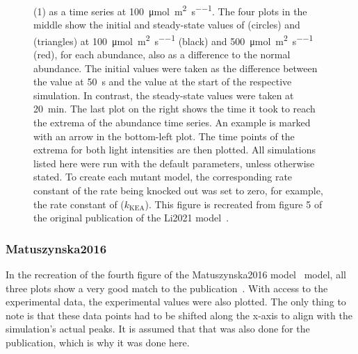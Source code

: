 \begin{figure}
{(1) as a time series at \qty{100}{\micro\mol\per\square\meter\per\second}. The four plots in the middle show the initial and steady-state values of  (circles) and  (triangles) at \qty{100}{\micro\mol\per\square\meter\per\second} (black) and \qty{500}{\micro\mol\per\square\meter\per\second} (red), for each abundance, also as a difference to the normal abundance. The initial values were taken as the difference between the value at \qty{50}{\second} and the value at the start of the respective simulation. In contrast, the steady-state values were taken at \qty{20}{\minute}. The last plot on the right shows the time it took to reach the extrema of the  abundance time series. An example is marked with an arrow in the bottom-left plot. The time points of the extrema for both light intensities are then plotted. All simulations listed here were run with the default parameters, unless otherwise stated. To create each mutant model, the corresponding rate constant of the rate being knocked out was set to zero, for example, the rate constant of  ($k_\mathrm{KEA}$). This figure is recreated from figure 5 of the original publication of the Li2021 model~\cite{liImpactIonFluxes2021}.
    }
    \label{fig:li2021-fig5}
\end{figure}

\subsubsection{Matuszynska2016}

In the recreation of the fourth figure of the Matuszynska2016 model~\cite{matuszynskaMathematicalModelNonphotochemical2016} model, all three plots show a very good match to the publication~. With access to the experimental data, the experimental values were also plotted. The only thing to note is that these data points had to be shifted along the x-axis to align with the simulation's actual peaks. It is assumed that that was also done for the publication, which is why it was done here.

